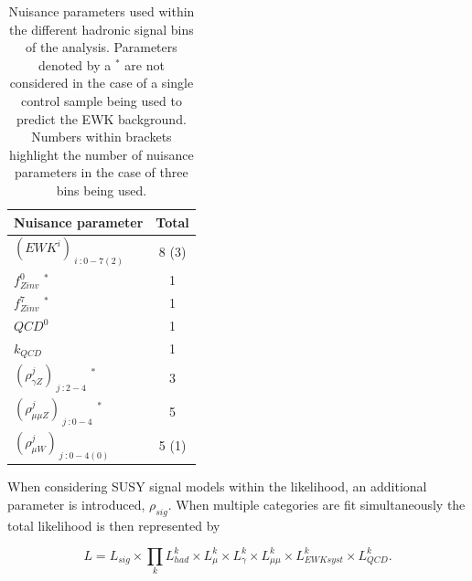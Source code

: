  \begin{table}[h!]
 \footnotesize
\begin{center}
\begin{tabular*}{0.45\textwidth}{@{\extracolsep{\fill}}lc}
\hline
Nuisance parameter & Total \\
\hline\hline
$(EWK^{i})_{\ i\ : 0-7(2)}$ & 8 (3) \\
$f^{0}_{Zinv}$ $^{*}$ & 1 \\
 $f^{7}_{Zinv}$ $^{*}$ & 1 \\
 $QCD^{0}$ & 1 \\
 $k_{QCD}$ & 1 \\
 $(\rho^{j}_{\gamma Z})_{\ j \ : 2-4}$ $^{*}$ & 3 \\
 $(\rho^{j}_{\mu\mu Z})_{\ j \ : 0-4}$  $^{*}$ & 5 \\
 $(\rho^{j}_{\mu W})_{\ j \ : 0-4(0)}$ & 5 (1) \\
\end{tabular*}
\end{center}
\caption[Nuisance parameters used within the different hadronic signal bins of the analysis]{Nuisance parameters used within the different hadronic signal bins of the analysis. Parameters denoted by a $^{*}$ are not considered in the case of a single control sample being used to predict the \ac{EWK} background. Numbers within brackets highlight the number of nuisance parameters in the case of three \theht bins being used.}\label{tab:nuisanceparameters}
\end{table}

When considering \ac{SUSY} signal models within the likelihood, an additional parameter is introduced, $\rho_{sig}$. When multiple categories are fit simultaneously the total likelihood is then represented by 

\begin{equation}
L =  L_{sig} \times \prod_{k} L^{k}_{had} \times  L^{k}_{\mu} \times  L^{k}_{\gamma} \times  L^{k}_{\mu\mu} \times  L^{k}_{EWK syst} \times  L^{k}_{QCD}.
\end{equation}
